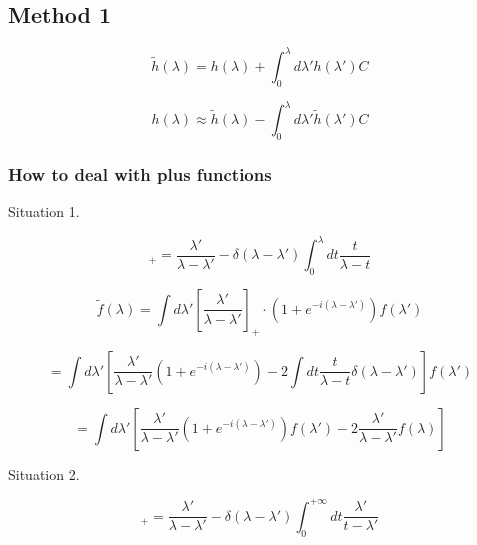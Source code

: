 \documentclass{article}
\begin{document}
\subsection{Method 1}
\begin{equation}
    \tilde{h}(\lambda) = h(\lambda) + \int_{0}^{\lambda} d \lambda' h(\lambda') C
\end{equation}

\begin{equation}
    h(\lambda) \approx \tilde{h}(\lambda) - \int_{0}^{\lambda} d \lambda' \tilde{h}(\lambda') C
\end{equation}

\subsubsection{How to deal with plus functions}

\noindent 

Situation 1.

\begin{equation}
    [\frac{\lambda'}{\lambda - \lambda'}]_{+} = \frac{\lambda'}{\lambda - \lambda'} - \delta(\lambda - \lambda') \int_0^{\lambda} dt \frac{t}{\lambda - t}
\end{equation}

\begin{equation}
    \tilde{f}(\lambda) = \int d \lambda' [\frac{\lambda'}{\lambda - \lambda'}]_{+} \cdot (1+e^{-i(\lambda - \lambda')}) f(\lambda') 
\end{equation}

\begin{equation}
    = \int d \lambda' [ \frac{\lambda'}{\lambda - \lambda'} (1+e^{-i(\lambda - \lambda')}) - 2 \int dt \frac{t}{\lambda - t} \delta(\lambda - \lambda') ] f(\lambda')  
\end{equation}

\begin{equation}
    = \int d \lambda' [ \frac{\lambda'}{\lambda - \lambda'} (1+e^{-i(\lambda - \lambda')}) f(\lambda') - 2 \frac{\lambda'}{\lambda - \lambda'} f(\lambda) ]
\end{equation}

Situation 2.

\begin{equation}
    [\frac{\lambda'}{\lambda - \lambda'}]_{+} = \frac{\lambda'}{\lambda - \lambda'} - \delta(\lambda - \lambda') \int_0^{+\infty} dt \frac{\lambda'}{t - \lambda'}
\end{equation}
\end{document}
